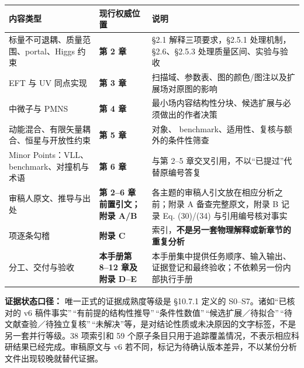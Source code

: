 \documentclass[
  chinese,
  UTF8]{ctexart}
\newcounter{none} %
\begin{document}
{\def\LTcaptype{none} %
\begin{longtable}[]{@{}
  >{\raggedright\arraybackslash}p{}
  >{\raggedright\arraybackslash}p{}
  >{\raggedright\arraybackslash}p{}@{}}
\toprule\noalign{}
\begin{minipage}[b]{\linewidth}\raggedright
内容类型
\end{minipage} & \begin{minipage}[b]{\linewidth}\raggedright
现行权威位置
\end{minipage} & \begin{minipage}[b]{\linewidth}\raggedright
说明
\end{minipage} \\
\midrule\noalign{}
\endhead
\bottomrule\noalign{}
\endlastfoot
标量不可退耦、质量范围、portal、Higgs 约束 & \textbf{第 2 章} & §2.1
解释三项要求，§2.5.1 处理机制，§2.6、§2.5.3 处理质量区间、实验与验收 \\
EFT 与 UV 同点实现 & \textbf{第 3 章} &
扫描域、参数表、图的颜色/图注以及扩展场对原图的影响 \\
中微子与 PMNS & \textbf{第 4 章} &
最小场内容结构性分块、候选扩展与必须做出的作者决策 \\
动能混合、有限矢量耦合、恒星与开放性约束 & \textbf{第 5 章} & 对象、
benchmark、适用性、复核与额外的条件性筛查 \\
Minor Points：VLL、benchmark、对撞机与术语 & \textbf{第 6 章} & 与第
2--5 章交叉引用，不以``已提过''代替原编号答复 \\
审稿人原文、推导与出处 & \textbf{第 2--6 章前置引文；附录 A/B} &
各主题的审稿人引文放在相应分析之前；附录 A 备查完整原文，附录 B 记录 Eq.
(30)/(34) 与引用编号核对事实 \\
38 项逐条勾稽 & \textbf{附录 C} &
索引，\textbf{不是另一套物理解释或新章节的重复分析} \\
分工、交付与验收 & \textbf{本手册第 8--12 章及附录 D--E} &
本手册集中提供任务顺序、输入输出、证据登记和最终验收；不依赖另一份内部执行手册 \\
\end{longtable}
}

\textbf{证据状态口径：} 唯一正式的证据成熟度等级是 §10.7.1 定义的
S0--S7。诸如``已核对的 v6
稿件事实''\,``有前提的结构性推导''\,``条件性数值''\,``候选扩展／待拟合''\,``待文献查验／待独立复核''\,``未解决''等，是对结论性质或未决原因的文字标签，不是另一套并行等级。38
项索引和 59
个原子条目只用于追踪覆盖情况，不表示相应科研结果已经完成。审稿原文与 v6
若不同，标记为待确认版本差异，不以某份分析文件出现较晚就替代证据。
\end{document}
